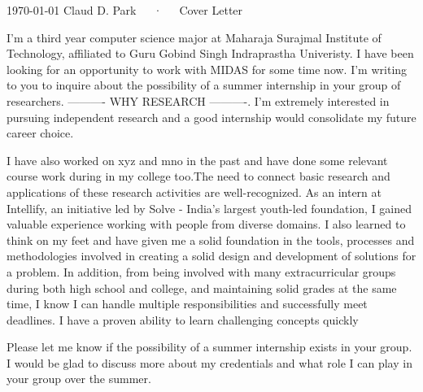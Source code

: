 \documentclass[11pt, a4paper]{awesome-cv}
\begin{document}
\makecvheader[R]

\makecvfooter
  {\today}
  {Claud D. Park~~~·~~~Cover Letter}
  {}

\makelettertitle

\begin{cvletter}

I'm a third year computer science major at Maharaja Surajmal Institute of Technology, affiliated to Guru Gobind Singh Indraprastha Univeristy. I have been looking for an opportunity to work with MIDAS for some time now. I'm writing to you to inquire about the possibility of a summer internship in your group of researchers. ---------- WHY RESEARCH ----------. I'm extremely interested in pursuing independent research and a good internship would consolidate my future career choice.

I have also worked on xyz and mno in the past and have done some relevant course work during in my college too.The need to connect basic research and applications of these research activities are well-recognized. As an intern at Intellify, an initiative led by Solve - India’s largest youth-led
foundation, I gained valuable experience working with people from diverse
domains. I also learned to think on my feet and have given me a solid foundation
in the tools, processes and methodologies involved in creating a solid design and
development of solutions for a problem. In addition, from being involved with
many extracurricular groups during both high school and college, and
maintaining solid grades at the same time, I know I can handle multiple
responsibilities and successfully meet deadlines. I have a proven ability to learn
challenging concepts quickly

Please let me know if the possibility of a summer internship exists in your group. I would be glad to discuss more about my credentials and what role I can play in your group over the summer.

\end{cvletter}


\makeletterclosing
\end{document}
